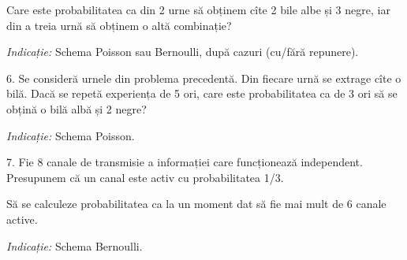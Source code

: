 \documentclass[12pt,a4paper]{article}
\theoremstyle{dotless}
\theoremstyle{dotlessdr}
\begin{document}
Care este probabilitatea ca din 2 urne să obținem cîte 2 bile albe și 3 negre,
iar din a treia urnă să obținem o altă combinație?

\emph{Indicație:} Schema Poisson sau Bernoulli, după cazuri (cu/fără repunere).

\vspace{1cm}

6. Se consideră urnele din problema precedentă. Din fiecare urnă se extrage
cîte o bilă. Dacă se repetă experiența de 5 ori, care este probabilitatea ca
de 3 ori să se obțină o bilă albă și 2 negre?

\emph{Indicație:} Schema Poisson.

\vspace{1cm}

7. Fie 8 canale de transmisie a informației care funcționează independent.
Presupunem că un canal este activ cu probabilitatea 1/3.

Să se calculeze probabilitatea ca la un moment dat să fie mai mult de 6 canale
active.

\emph{Indicație:} Schema Bernoulli.
\end{document}
